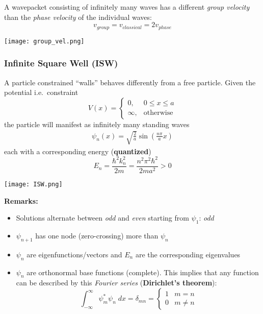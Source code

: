 
A wavepacket consisting of infinitely many waves has a different \textit{group velocity} than the \textit{phase velocity} of the individual waves:
\noindent\begin{equation*}
    v_{group} = v_{classical} = 2v_{phase}
\end{equation*}

\begin{center}
    \texttt{[image: group\_vel.png]}
\end{center}


\subsubsection{Infinite Square Well (ISW)}\label{ssec:ISW}
A particle constrained ``walls'' behaves differently from a free particle. Given the potential i.e.\ constraint
\noindent\begin{equation*}
    V(x)=\begin{cases}0,&0\le x\le a\\\infty,&\text{otherwise}\end{cases}
\end{equation*}
the particle will manifest as infinitely many standing waves
\noindent\begin{align*}
    \psi_{n}(x)=\sqrt{\frac{2}{a}}\sin\left(\frac{n\pi}{a}x\right)
\end{align*}
each with a corresponding energy (\textbf{quantized})
\noindent\begin{equation*}
    E_{n}=\frac{\hbar^{2}k_{n}^{2}}{2m}=\frac{n^{2}\pi^{2}\hbar^{2}}{2ma^{2}} > 0
\end{equation*}

\begin{center}
    \texttt{[image: ISW.png]}
\end{center}

\textbf{Remarks:}
\begin{itemize}
    \item Solutions alternate between \textit{odd} and \textit{even} starting from $\psi_1$: \textit{odd}
    \item $\psi_{n+1}$ has one node (zero-crossing) more than $\psi_n$
    \item $\psi_n$ are eigenfunctions/vectors and $E_n$ are the corresponding eigenvalues
    \item $\psi_n$ are orthonormal base functions (complete). This implies that any function can be  described by this \textit{Fourier series} (\textbf{Dirichlet's theorem}):
          \noindent\begin{equation*}
              \int_{-\infty}^{\infty} \psi_m^*\psi_n\; dx = \delta_{mn}= \begin{cases}
                  1 & m=n     \\
                  0 & m\neq n
              \end{cases}
          \end{equation*}
\end{itemize}

